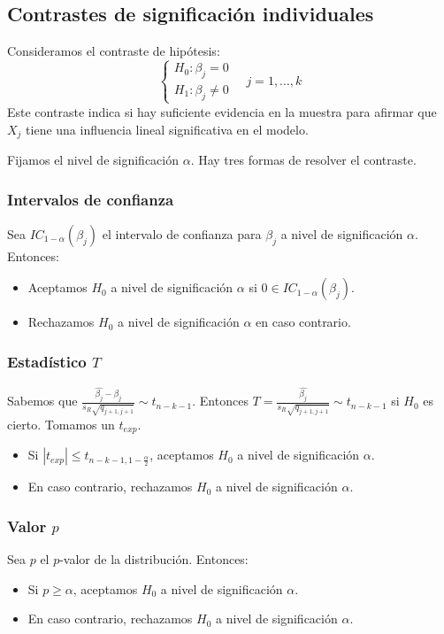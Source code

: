 \documentclass{report}
\theoremstyle{remark}
\theoremstyle{remark}
\theoremstyle{remark}
\theoremstyle{definition}
\theoremstyle{definition}
\theoremstyle{definition}
\begin{document}
\subsection*{Contrastes de significación individuales}
Consideramos el contraste de hipótesis:
$$\begin{cases}
        H_0: \beta_j = 0 \\
        H_1: \beta_j \neq 0
    \end{cases} \quad j = 1, \dots, k$$
Este contraste indica si hay suficiente evidencia en la muestra para afirmar que $X_j$ tiene una influencia lineal significativa en el modelo.

Fijamos el nivel de significación $\alpha$.
Hay tres formas de resolver  el contraste.

\subsubsection*{Intervalos de confianza}
Sea $IC_{1-\alpha}(\beta_j)$ el intervalo de confianza para $\beta_j$ a nivel de significación $\alpha$.
Entonces:
\begin{itemize}
    \item Aceptamos $H_0$ a nivel de significación $\alpha$ si $0 \in IC_{1-\alpha}(\beta_j)$.
    \item Rechazamos $H_0$ a nivel de significación $\alpha$ en caso contrario.
\end{itemize}

\subsubsection*{Estadístico $T$}
Sabemos que $\frac{\hat{\beta_j} - \beta_j}{s_R \sqrt{q_{j+1, j+1}}} \sim t_{n-k-1}$.
Entonces $T = \frac{\hat{\beta_j}}{s_R \sqrt{q_{j+1, j+1}}} \sim t_{n-k-1}$ si $H_0$ es cierto.
Tomamos un $t_{exp}$.
\begin{itemize}
    \item Si $|t_{exp}| \leq t_{n-k-1, 1-\frac{\alpha}{2}}$, aceptamos $H_0$ a nivel de significación $\alpha$.
    \item En caso contrario, rechazamos $H_0$ a nivel de significación $\alpha$.
\end{itemize}

\subsubsection*{Valor $p$}
Sea $p$ el $p$-valor de la distribución. Entonces:
\begin{itemize}
    \item Si $p \geq \alpha$, aceptamos $H_0$ a nivel de significación $\alpha$.
    \item En caso contrario, rechazamos $H_0$ a nivel de significación $\alpha$.
\end{itemize}
\end{document}
